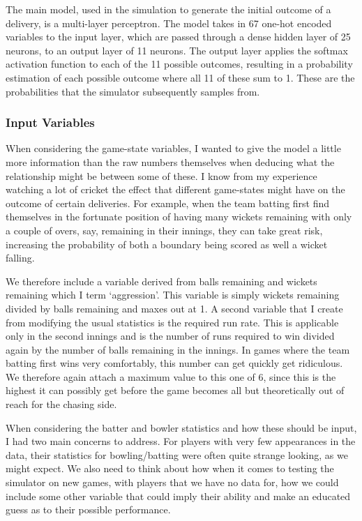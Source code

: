The main model, used in the simulation to generate the initial outcome of a delivery, is a multi-layer perceptron. The model takes in 67 one-hot encoded variables to the input layer, which are passed through a dense hidden layer of 25 neurons, to an output layer of 11 neurons. The output layer applies the softmax activation function to each of the 11 possible outcomes, resulting in a probability estimation of each possible outcome where all 11 of these sum to 1. These are the probabilities that the simulator subsequently samples from.

\subsubsection{Input Variables}

When considering the game-state variables, I wanted to give the model a little more information than the raw numbers themselves when deducing what the relationship might be between some of these. I know from my experience watching a lot of cricket the effect that different game-states might have on the outcome of certain deliveries. For example, when the team batting first find themselves in the fortunate position of having many wickets remaining with only a couple of overs, say, remaining in their innings, they can take great risk, increasing the probability of both a boundary being scored as well a wicket falling.

We therefore include a variable derived from balls remaining and wickets remaining which I term `aggression'. This variable is simply wickets remaining divided by balls remaining and maxes out at 1. A second variable that I create from modifying the usual statistics is the required run rate. This is applicable only in the second innings and is the number of runs required to win divided again by the number of balls remaining in the innings. In games where the team batting first wins very comfortably, this number can get quickly get ridiculous. We therefore again attach a maximum value to this one of 6, since this is the highest it can possibly get before the game becomes all but theoretically out of reach for the chasing side.

When considering the batter and bowler statistics and how these should be input, I had two main concerns to address. For players with very few appearances in the data, their statistics for bowling/batting were often quite strange looking, as we might expect. We also need to think about how when it comes to testing the simulator on new games, with players that we have no data for, how we could include some other variable that could imply their ability and make an educated guess as to their possible performance.

